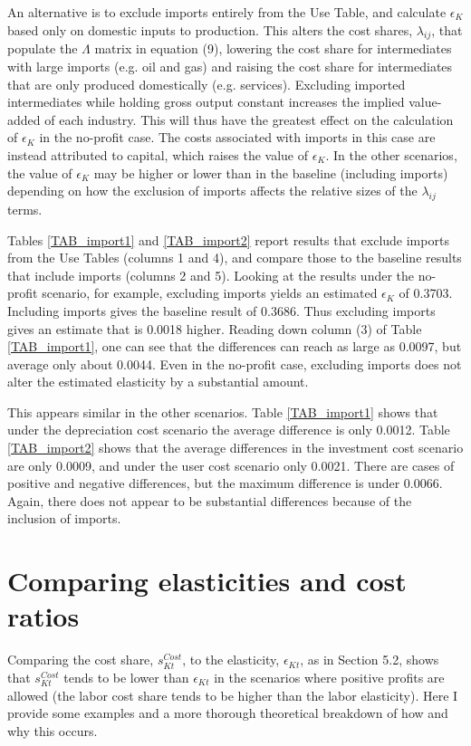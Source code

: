 \documentclass[11pt]{article}
\begin{document}
An alternative is to exclude imports entirely from the Use Table, and calculate $\epsilon_K$ based only on domestic inputs to production. This alters the cost shares, $\lambda_{ij}$, that populate the $\Lambda$ matrix in equation (9), lowering the cost share for intermediates with large imports (e.g. oil and gas) and raising the cost share for intermediates that are only produced domestically (e.g. services). Excluding imported intermediates while holding gross output constant increases the implied value-added of each industry. This will thus have the greatest effect on the calculation of $\epsilon_K$ in the no-profit case. The costs associated with imports in this case are instead attributed to capital, which raises the value of $\epsilon_K$. In the other scenarios, the value of $\epsilon_K$ may be higher or lower than in the baseline (including imports) depending on how the exclusion of imports affects the relative sizes of the $\lambda_{ij}$ terms. 

Tables \ref{TAB_import1} and \ref{TAB_import2} report results that exclude imports from the Use Tables (columns 1 and 4), and compare those to the baseline results that include imports (columns 2 and 5). Looking at the results under the no-profit scenario, for example, excluding imports yields an estimated $\epsilon_K$ of 0.3703. Including imports gives the baseline result of 0.3686. Thus excluding imports gives an estimate that is 0.0018 higher. Reading down column (3) of Table \ref{TAB_import1}, one can see that the differences can reach as large as 0.0097, but average only about 0.0044. Even in the no-profit case, excluding imports does not alter the estimated elasticity by a substantial amount.

This appears similar in the other scenarios. Table \ref{TAB_import1} shows that under the depreciation cost scenario the average difference is only 0.0012. Table \ref{TAB_import2} shows that the average differences in the investment cost scenario are only 0.0009, and under the user cost scenario only 0.0021. There are cases of positive and negative differences, but the maximum difference is under 0.0066. Again, there does not appear to be substantial differences because of the inclusion of imports.

\section{Comparing elasticities and cost ratios}
Comparing the cost share, $s_{Kt}^{Cost}$, to the elasticity, $\epsilon_{Kt}$, as in Section 5.2, shows that $s_{Kt}^{Cost}$ tends to be lower than $\epsilon_{Kt}$ in the scenarios where positive profits are allowed (the labor cost share tends to be higher than the labor elasticity). Here I provide some examples and a more thorough theoretical breakdown of how and why this occurs. 
\end{document}
